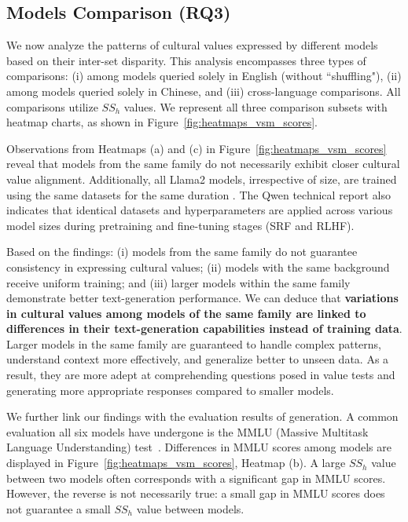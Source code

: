 \documentclass[11pt]{article}
\begin{document}
\subsection{Models Comparison (RQ3)}


We now analyze the patterns of cultural values expressed by different models based on their inter-set disparity. This analysis encompasses three types of comparisons: (i) among models queried solely in English (without ``shuffling"), (ii) among models queried solely in Chinese, and (iii) cross-language comparisons. All comparisons utilize $SS_h$ values. We represent all three comparison subsets with heatmap charts, as shown in Figure~\ref{fig:heatmaps_vsm_scores}.

Observations from Heatmaps (a) and (c) in Figure~\ref{fig:heatmaps_vsm_scores} reveal that models from the same family do not necessarily exhibit closer cultural value alignment. Additionally, all Llama2 models, irrespective of size, are trained using the same datasets for the same duration \cite{touvron2023llama}. The Qwen technical report \cite{bai2023qwen} also indicates that identical datasets and hyperparameters are applied across various model sizes during pretraining and fine-tuning stages (SRF and RLHF).


Based on the findings: (i) models from the same family do not guarantee consistency in expressing cultural values; (ii) models with the same background receive uniform training; and (iii) larger models within the same family demonstrate better text-generation performance. We can deduce that \textbf{variations in cultural values among models of the same family are linked to differences in their text-generation capabilities instead of training data}. Larger models in the same family are guaranteed to handle complex patterns, understand context more effectively, and generalize better to unseen data. As a result, they are more adept at comprehending questions posed in value tests and generating more appropriate responses compared to smaller models.

We further link our findings with the evaluation results of generation. A common evaluation all six models have undergone is the MMLU (Massive Multitask Language Understanding) test~\cite{hendrycks2021measuring}. Differences in MMLU scores among models are displayed in Figure~\ref{fig:heatmaps_vsm_scores}, Heatmap (b). A large $SS_h$ value between two models often corresponds with a significant gap in MMLU scores. However, the reverse is not necessarily true: a small gap in MMLU scores does not guarantee a small $SS_h$ value between models.
\end{document}
